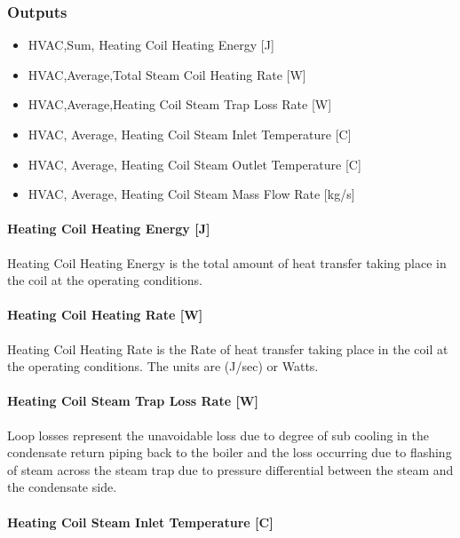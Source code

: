 \subsubsection{Outputs}\label{heating-coil-steam-outputs}

\begin{itemize}
\item
  HVAC,Sum, Heating Coil Heating Energy {[}J{]}
\item
  HVAC,Average,Total Steam Coil Heating Rate {[}W{]}
\item
  HVAC,Average,Heating Coil Steam Trap Loss Rate {[}W{]}
\item
  HVAC, Average, Heating Coil Steam Inlet Temperature {[}C{]}
\item
  HVAC, Average, Heating Coil Steam Outlet Temperature {[}C{]}
\item
  HVAC, Average, Heating Coil Steam Mass Flow Rate {[}kg/s{]}
\end{itemize}

\paragraph{Heating Coil Heating Energy {[}J{]}}\label{heating-coil-heating-energy-j-1}

Heating Coil Heating Energy is the total amount of heat transfer taking place in the coil at the operating conditions.

\paragraph{Heating Coil Heating Rate {[}W{]}}\label{heating-coil-heating-rate-w-1}

Heating Coil Heating Rate is the Rate of heat transfer taking place in the coil at the operating conditions. The units are (J/sec) or Watts.

\paragraph{Heating Coil Steam Trap Loss Rate {[}W{]}}\label{heating-coil-steam-trap-loss-rate-w}

Loop losses represent the unavoidable loss due to degree of sub cooling in the condensate return piping back to the boiler and the loss occurring due to flashing of steam across the steam trap due to pressure differential between the steam and the condensate side.

\paragraph{Heating Coil Steam Inlet Temperature {[}C{]}}\label{heating-coil-steam-inlet-temperature-c}


